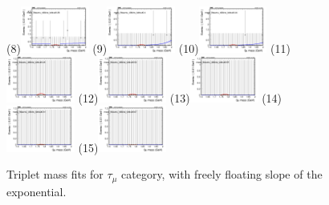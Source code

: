 \begin{figure}[h!]
        \subfigure(8){\includegraphics[width=0.2\textwidth]{unfixed_exp/plots/taumu/massfit_taumu_40bins_bdtcut0.36.png}}
        \subfigure(9){\includegraphics[width=0.2\textwidth]{unfixed_exp/plots/taumu/massfit_taumu_40bins_bdtcut0.4.png}}
        \subfigure(10){\includegraphics[width=0.2\textwidth]{unfixed_exp/plots/taumu/massfit_taumu_40bins_bdtcut0.44.png}}
        \subfigure(11){\includegraphics[width=0.2\textwidth]{unfixed_exp/plots/taumu/massfit_taumu_40bins_bdtcut0.48.png}}
        \subfigure(12){\includegraphics[width=0.2\textwidth]{unfixed_exp/plots/taumu/massfit_taumu_40bins_bdtcut0.52.png}}
        \subfigure(13){\includegraphics[width=0.2\textwidth]{unfixed_exp/plots/taumu/massfit_taumu_40bins_bdtcut0.55.png}}
        \subfigure(14){\includegraphics[width=0.2\textwidth]{unfixed_exp/plots/taumu/massfit_taumu_40bins_bdtcut0.61.png}}
        \subfigure(15){\includegraphics[width=0.2\textwidth]{unfixed_exp/plots/taumu/massfit_taumu_40bins_bdtcut0.67.png}}
        \caption{Triplet mass fits for $\tau_{\mu}$ category, with freely floating slope of the exponential.}
        \label{fig:unfixed_taumu}
\end{figure}

